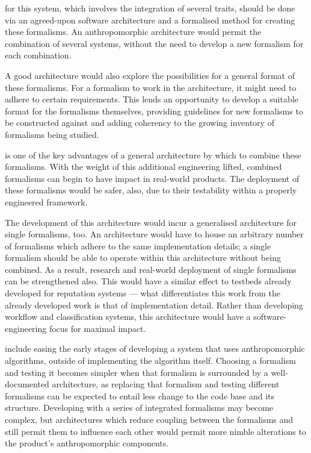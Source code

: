  for this system, which involves the integration of several traits, should be done via an agreed-upon software architecture and a formalised method for creating these formalisms. An anthropomorphic architecture would permit the combination of several systems, without the need to develop a new formalism for each combination.\par

A good architecture would also explore the possibilities for a general format of these formalisms. For a formalism to work in the architecture, it might need to adhere to certain requirements. This lends an opportunity to develop a suitable format for the formalisms themselves, providing guidelines for new formalisms to be constructed against and adding coherency to the growing inventory of formalisms being studied.\par

 is one of the key advantages of a general architecture by which to combine these formalisms. With the weight of this additional engineering lifted, combined formalisms can begin to have impact in real-world products. The deployment of these formalisms would be safer, also, due to their testability within a properly engineered framework.\par

The development of this architecture would incur a generalised architecture for single formalisms, too. An architecture would have to house an arbitrary number of formalisms which adhere to the same implementation details; a single formalism should be able to operate within this architecture without being combined. As a result, research and real-world deployment of single formalisms can be strengthened also. This would have a similar effect to testbeds already developed for reputation systems\cite{Chandrasekaran2011} --- what differentiates this work from the already developed work is that of implementation detail. Rather than developing workflow and classification systems, this architecture would have a software-engineering focus for maximal impact.\par

 include easing the early stages of developing a system that uses anthropomorphic algorithms, outside of implementing the algorithm itself. Choosing a formalism and testing it becomes simpler when that formalism is surrounded by a well-documented architecture, as replacing that formalism and testing different formalisms can be expected to entail less change to the code base and its structure. Developing with a series of integrated formalisms may become complex, but architectures which reduce coupling between the formalisms and still permit them to influence each other would permit more nimble alterations to the product's anthropomorphic components.\par

